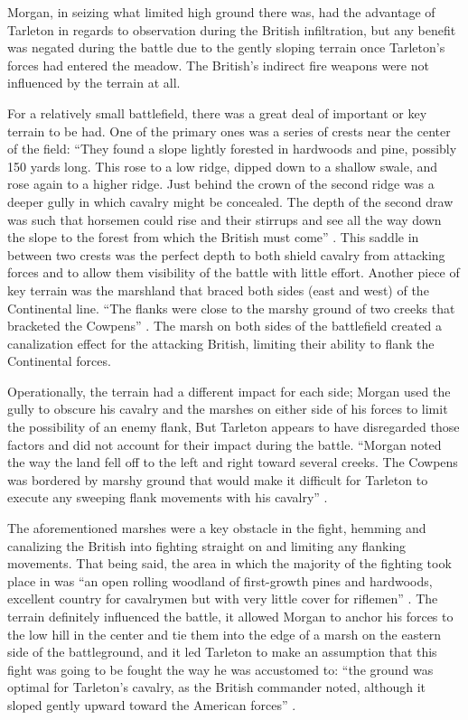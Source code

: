 Morgan, in seizing what limited high ground there was, had the advantage of
Tarleton in regards to observation during the British infiltration, but any
benefit was negated during the battle due to the gently sloping terrain once
Tarleton's forces had entered the meadow.  The British's indirect fire weapons
were not influenced by the terrain at all. 

For a relatively small battlefield, there was a great deal of important or key
terrain to be had.  One of the primary ones was a series of crests near the
center of the field: ``They found a slope lightly forested in hardwoods and
pine, possibly 150 yards long. This rose to a low ridge, dipped down to a
shallow swale, and rose again to a higher ridge.  Just behind the crown of the
second ridge was a deeper gully in which cavalry might be concealed.  The depth
of the second draw was such that horsemen could rise and their stirrups and see
all the way down the slope to the forest from which the British must come''
\cite[126]{lumpkin_savannah_1981}. This saddle in between two crests was the
perfect depth to both shield cavalry from attacking forces and to allow them
visibility of the battle with little effort.   Another piece of key terrain was
the marshland that braced both sides (east and west) of the Continental line.
``The flanks were close to the marshy ground of two creeks that bracketed the
Cowpens'' \cite[327]{stephenson_patriot_2007}.  The marsh on both sides of the
battlefield created a canalization effect for the attacking British, limiting
their ability to flank the Continental forces.  

Operationally, the terrain had a different impact for each side; Morgan used
the gully to obscure his cavalry and the marshes on either side of his forces
to limit the possibility of an enemy flank, But Tarleton appears to have
disregarded those factors and did not account for their impact during the
battle.  ``Morgan noted the way the land fell off to the left and right toward
several creeks.  The Cowpens was bordered by marshy ground that would make it
difficult for Tarleton to execute any sweeping flank movements with his
cavalry'' \cite[45]{fleming_cowpens_1988}.

The aforementioned marshes were a key obstacle in the fight, hemming and
canalizing the British into fighting straight on and limiting any flanking
movements.  That being said, the area in which the majority of the fighting
took place in was ``an open rolling woodland of first-growth pines and
hardwoods, excellent country for cavalrymen but with very little cover for
riflemen'' \cite[124]{lumpkin_savannah_1981}.  The terrain definitely
influenced the battle, it allowed Morgan to anchor his forces to the low hill
in the center and tie them into the edge of a marsh on the eastern side of the
battleground, and it led Tarleton to make an assumption that this fight was
going to be fought the way he was accustomed to: ``the ground was optimal for
Tarleton's cavalry, as the British commander noted, although it sloped gently
upward toward the American forces'' \cite[46]{moncure_cowpens_1996}.

